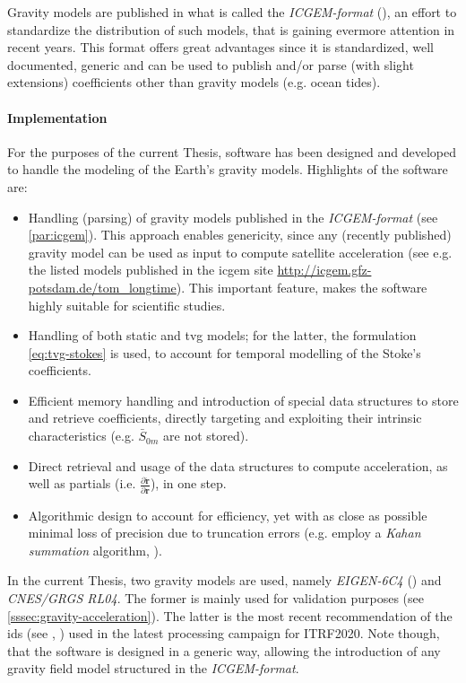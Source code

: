 Gravity models are published in what is called the \emph{ICGEM-format} 
(\cite{ICGEMFormat}), an effort to standardize the distribution of such models, 
that is gaining evermore attention in recent years. This format offers great 
advantages since it is standardized, well documented, generic and can be used to 
publish and/or parse (with slight extensions) coefficients other than gravity 
models (e.g. ocean tides).

\paragraph{Implementation}\label{par:implementation}
For the purposes of the current Thesis, software has been designed and developed 
to handle the modeling of the Earth's gravity models. Highlights of the software 
are:
\begin{itemize}
  \item Handling (parsing) of gravity models published in the \emph{ICGEM-format} 
    (see \autoref{par:icgem}). This approach enables genericity, since any (recently 
    published) gravity model can be used as input to compute satellite acceleration 
    (see e.g. the listed models published in the \gls{icgem} site \url{http://icgem.gfz-potsdam.de/tom_longtime}).
    This important feature, makes the software highly suitable for scientific studies.
  \item Handling of both static and \gls{tvg} models; for the latter, the formulation 
    \autoref{eq:tvg-stokes} is used, to account for temporal modelling of the 
    Stoke's coefficients.
  \item Efficient memory handling and introduction of special data structures to 
    store and retrieve coefficients, directly targeting and exploiting their intrinsic
    characteristics (e.g. $\bar{S}_{0m}$ are not stored).
  \item Direct retrieval and usage of the data structures to compute acceleration, 
    as well as partials (i.e. $\frac{\partial \bm{\ddot{r}}}{\partial \bm{r}}$), 
    in one step.
  \item Algorithmic design to account for efficiency, yet with as close as possible 
    minimal loss of precision due to truncation errors (e.g. employ a 
    \emph{Kahan summation} algorithm, \cite{Klein2006}).
\end{itemize}

In the current Thesis, two gravity models are used, namely \emph{EIGEN-6C4} 
(\cite{Forste2014}) and \emph{CNES/GRGS RL04}. The former is mainly used for validation 
purposes (see \autoref{sssec:gravity-acceleration}). The latter is the most 
recent recommendation of the \gls{ids} (see \cite{Lemoine2019b}, \cite{Stepanek2022a}) 
used in the latest processing campaign for ITRF2020. Note though, that the software 
is designed in a generic way, allowing the introduction of any gravity field model 
structured in the \emph{ICGEM-format}.

